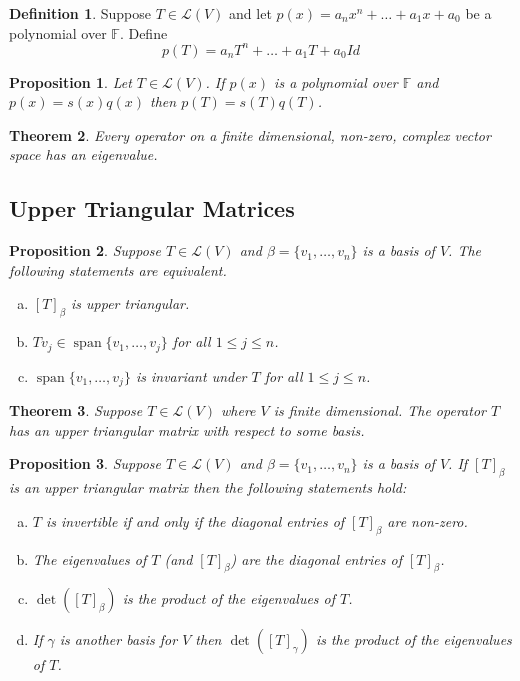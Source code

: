 \documentclass[12pt,letterpaper]{article}
\renewcommand{\span}{\operatorname {span}}
\theoremstyle{plain}
\newtheorem{theorem}{Theorem}[section]
\newtheorem{proposition}{Proposition}[section]
\theoremstyle{definition}
\newtheorem{definition}[theorem]{Definition}
\numberwithin{equation}{section}
\begin{document}
\begin{definition}Suppose  $T\in \mathcal{L}(V)$ and let $p(x)=a_nx^n+\ldots+a_1x+a_0$ be a polynomial over $\mathbb{F}$. Define
\[p(T)=a_nT^n+\ldots+a_1T+a_0Id\]

\end{definition}

\begin{proposition} Let $T\in \mathcal{L}(V)$. If $p(x)$ is a polynomial over $\mathbb{F}$ and $p(x)=s(x)q(x)$ then $p(T)=s(T)q(T)$. 
\end{proposition}


\begin{theorem} Every operator on a finite dimensional, non-zero, \emph{complex} vector space has an eigenvalue. 
\end{theorem}

\subsection{Upper Triangular Matrices}
\begin{proposition}Suppose $T\in \mathcal{L}(V)$ and $\beta=\{v_1, \ldots, v_n\}$ is a basis of $V$. The following statements are equivalent. 
\begin{enumerate}[(a)]
\item $[T]_\beta$ is upper triangular. 
\item $Tv_j\in \span\{v_1, \ldots, v_j\}$ for all $1\leq j\leq n$. 
\item $\span\{v_1, \ldots, v_j\}$ is invariant under $T$ for all $1\leq j\leq n$. 
\end{enumerate}
\end{proposition}

\begin{theorem}Suppose $T\in \mathcal{L}(V)$ where $V$ is finite dimensional. The operator $T$ has an upper triangular matrix with respect to some basis. 
\end{theorem}

\begin{proposition}Suppose $T\in \mathcal{L}(V)$ and $\beta=\{v_1, \ldots, v_n\}$ is a basis of $V$. If $[T]_\beta$ is an upper triangular matrix then the following statements hold:
\begin{enumerate}[(a)]
\item $T$ is invertible if and only if the diagonal entries of $[T]_\beta$ are non-zero. 
\item The eigenvalues of $T$ (and $[T]_\beta$) are the diagonal entries of $[T]_\beta$. 
\item $\det([T]_\beta)$ is the product of the eigenvalues of $T$. 
\item If $\gamma$ is another basis for $V$ then $\det([T]_\gamma)$ is the product of the eigenvalues of $T$. 
\end{enumerate}
\end{proposition}
\end{document}
